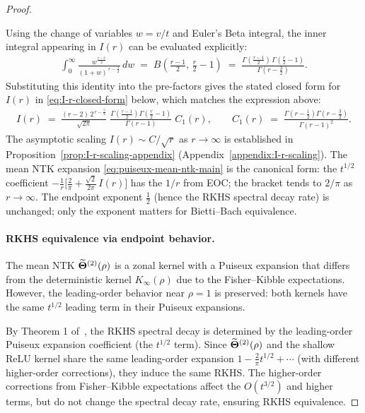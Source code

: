 \begin{proof}
\begin{remark}
Using the change of variables \( w=v/t \) and Euler's Beta integral, the inner integral appearing in \( I(r) \) can be evaluated explicitly:
\begin{align}
\int_{0}^{\infty} \frac{w^{\frac{r-3}{2}}}{(1+w)^{\,r-\frac{3}{2}}}\,dw
\;=\; B\!\left(\frac{r-1}{2},\,\frac{r}{2}-1\right)
\;=\; \frac{\Gamma\!\left(\frac{r-1}{2}\right)\,\Gamma\!\left(\frac{r}{2}-1\right)}{\Gamma\!\left(r-\frac{3}{2}\right)}.
\end{align}
Substituting this identity into the pre-factors gives the stated closed form for \( I(r) \) in \eqref{eq:I-r-closed-form} below, which matches the expression above:
\begin{align}
\label{eq:I-r-closed-form}
I(r) \;=\; \frac{(r-2)\,2^{\,r-\frac{5}{2}}}{\sqrt{2\pi}}\;
\frac{\Gamma\!\left(\frac{r-1}{2}\right)\Gamma\!\left(\frac{r}{2}-1\right)}{\Gamma(r-1)}\;
C_1(r),\qquad
C_1(r) \;=\; \frac{\Gamma\!\left(r-\tfrac{1}{2}\right)\Gamma\!\left(r-\tfrac{3}{2}\right)}{\Gamma(r-1)^2}.
\end{align}
The asymptotic scaling \( I(r) \sim C/\sqrt{r} \) as \( r\to\infty \) is established in Proposition~\ref{prop:I-r-scaling-appendix} (Appendix~\ref{appendix:I-r-scaling}). The mean NTK expansion \eqref{eq:puiseux-mean-ntk-main} is the canonical form: the \( t^{1/2} \) coefficient \( -\frac{1}{r}\big[\frac{2}{\pi}+\frac{\sqrt{2}}{2\pi}\,I(r)\big] \) has the \( 1/r \) from EOC; the bracket tends to \( 2/\pi \) as \( r\to\infty \). The endpoint exponent \( \tfrac{1}{2} \) (hence the RKHS spectral decay rate) is unchanged; only the exponent matters for Bietti--Bach equivalence.
\end{remark}

\paragraph{RKHS equivalence via endpoint behavior.}
The mean NTK \( \widetilde{\boldsymbol{\Theta}}^{(2)}(\rho) \) is a zonal kernel with a Puiseux expansion that differs from the deterministic kernel \( K_{\infty}(\rho) \) due to the Fisher–Kibble expectations. However, the leading-order behavior near \( \rho = 1 \) is preserved: both kernels have the same \( t^{1/2} \) leading term in their Puiseux expansions.

By Theorem 1 of~\cite{bietti2021deepequalsshallowrelu}, the RKHS spectral decay is determined by the leading-order Puiseux expansion coefficient (the \( t^{1/2} \) term). Since \( \widetilde{\boldsymbol{\Theta}}^{(2)}(\rho) \) and the shallow ReLU kernel share the same leading-order expansion \( 1 - \frac{2}{\pi} t^{1/2} + \cdots \) (with different higher-order corrections), they induce the same RKHS. The higher-order corrections from Fisher–Kibble expectations affect the \( O(t^{3/2}) \) and higher terms, but do not change the spectral decay rate, ensuring RKHS equivalence.


\end{proof}
